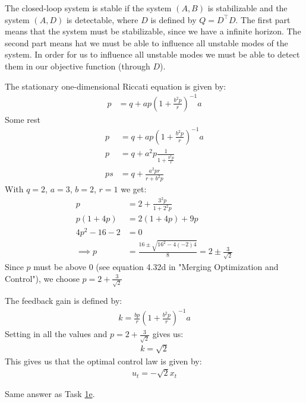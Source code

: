 \documentclass[11pt, a4paper, english]{NTNUoving}
\begin{document}
\begin{oppgave}
    \begin{punkt}
        \label{1e}
        The closed-loop system is stable if the system $(A,B)$ is stabilizable and the system $(A,D)$ is detectable,
        where $D$ is defined by $Q=D^\top D$. The first part means that the system must be stabilizable, since we have a infinite horizon.
        The second part means hat we must be able to influence all unstable modes of the system. In order for us to influence
        all unstable modes we must be able to detect them in our objective function (through $D$).
    \end{punkt}
\end{oppgave}

\begin{oppgave}

    \begin{punkt}
        The stationary one-dimensional Riccati equation is given by:
        \begin{align*}
            p &= q + ap(1+\frac{b^2p}{r})^{-1}a
        \end{align*}
        Some rest
        \begin{align*}
            p &= q + ap(1+\frac{b^2p}{r})^{-1}a \\
            p &= q + a^2p \frac{1}{1+\frac{b^2p}{r}} \\
            p s&= q + \frac{a^2pr}{r+b^2p}
        \end{align*}
        With $q=2$, $a=3$, $b=2$, $r=1$ we get:
        \begin{align*}
            p &= 2 + \frac{3^2p}{1+2^2p} \\
            p(1+4p) &=2(1+4p)+9p \\
            4p^2 - 16 -2 &= 0 \\
            \implies p &= \frac{16 \pm \sqrt{16^2-4(-2)4}}{8} = 2 \pm \frac{3}{\sqrt{2}}
        \end{align*}
        Since $p$ must be above 0 (see equation 4.32d in "Merging Optimization and Control"), we choose
        $p = 2 + \frac{3}{\sqrt{2}}$
    \end{punkt}

    \begin{punkt}
        The feedback gain is defined by:
        \begin{align*}
            k = \frac{bp}{r}(1 + \frac{b^2p}{r})^{-1}a
        \end{align*}
        Setting in all the values and $p = 2 + \frac{3}{\sqrt{2}}$ gives us:
        \begin{align*}
            k = \sqrt{2}
        \end{align*}
        This gives us that the optimal control law is given by:
        \begin{align*}
            u_t = -\sqrt{2}x_t
        \end{align*}
    \end{punkt}

    \begin{punkt}
        Same answer as Task \hyperref[1e]{1e}.
    \end{punkt}
\end{oppgave}
\end{document}
